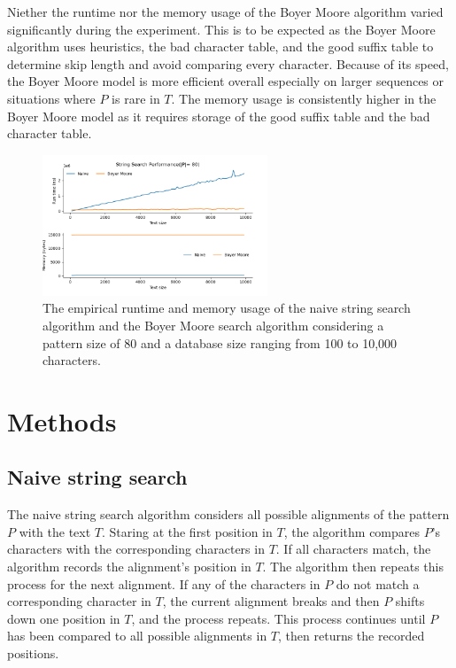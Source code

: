 \documentclass[11pt, letterpaper]{article}
\begin{document}
Niether the runtime nor the memory usage of the Boyer Moore algorithm varied 
significantly during the experiment. This is to be expected as the Boyer Moore 
algorithm uses heuristics, the bad character table, and the good suffix table 
to determine skip length and avoid comparing every character. Because of its
speed, the Boyer Moore model is more efficient overall especially on larger 
sequences or situations where $P$ is rare in $T$. The memory usage is 
consistently higher in the Boyer Moore model as it requires storage of the 
good suffix table and the bad character table. 

\begin{figure}[ht] \centering
    \includegraphics[width=0.6\textwidth]{./doc/results10000.png}
    \caption{The empirical runtime and memory usage of the naive string search
    algorithm and the Boyer Moore search algorithm considering a pattern size 
    of 80 and a database size ranging from 100 to 10,000 characters.}
    \label{timeandmem}
\end{figure}

\section{Methods}

\subsection{Naive string search}
The naive string search algorithm considers all possible alignments of the
pattern $P$ with the text $T$. Staring at the first position in $T$, the
algorithm compares $P$'s characters with the corresponding characters in $T$.
If all characters match, the algorithm records the alignment's position in $T$.
The algorithm then repeats this process for the next alignment. If any of the 
characters in $P$ do not match a corresponding character in $T$, the current
alignment breaks and then $P$ shifts down one position in $T$, and the process
repeats. This process continues until $P$ has been compared to all possible
alignments in $T$, then returns the recorded positions.
\end{document}
